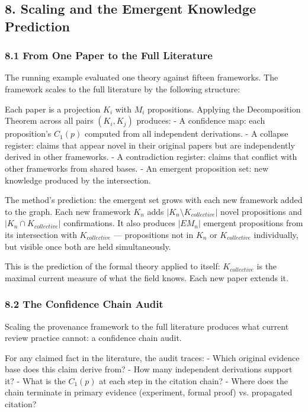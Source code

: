 \documentclass[
]{article}
\begin{document}
\subsection{8. Scaling and the Emergent Knowledge
Prediction}\label{scaling-and-the-emergent-knowledge-prediction}

\subsubsection{8.1 From One Paper to the Full
Literature}\label{from-one-paper-to-the-full-literature}

The running example evaluated one theory against fifteen frameworks. The
framework scales to the full literature by the following structure:

Each paper is a projection \(K_i\) with \(M_i\) propositions. Applying
the Decomposition Theorem across all pairs \((K_i, K_j)\) produces: - A
confidence map: each proposition's \(C_1(p)\) computed from all
independent derivations. - A collapse register: claims that appear novel
in their original papers but are independently derived in other
frameworks. - A contradiction register: claims that conflict with other
frameworks from shared bases. - An emergent proposition set: new
knowledge produced by the intersection.

The method's prediction: the emergent set grows with each new framework
added to the graph. Each new framework \(K_n\) adds
\(|K_n \setminus K_{collective}|\) novel propositions and
\(|K_n \cap K_{collective}|\) confirmations. It also produces \(|EM_n|\)
emergent propositions from its intersection with \(K_{collective}\) ---
propositions not in \(K_n\) or \(K_{collective}\) individually, but
visible once both are held simultaneously.

This is the prediction of the formal theory applied to itself:
\(K_{collective}\) is the maximal current measure of what the field
knows. Each new paper extends it.

\subsubsection{8.2 The Confidence Chain
Audit}\label{the-confidence-chain-audit}

Scaling the provenance framework to the full literature produces what
current review practice cannot: a confidence chain audit.

For any claimed fact in the literature, the audit traces: - Which
original evidence base does this claim derive from? - How many
independent derivations support it? - What is the \(C_1(p)\) at each
step in the citation chain? - Where does the chain terminate in primary
evidence (experiment, formal proof) vs. propagated citation?
\end{document}
